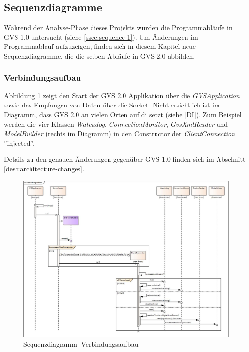 \documentclass[11pt,a4paper,english,oneside]{book}
\numberwithin{equation}{chapter}
\begin{document}
	\subsection{Sequenzdiagramme}
	Während der Analyse-Phase dieses Projekts wurden die Programmabläufe in GVS 1.0 untersucht (siehe \ref{ssec:sequence-1}). Um Änderungen im Programmablauf aufzuzeigen, finden sich in diesem Kapitel neue Sequenzdiagramme, die die selben Abläufe in GVS 2.0 abbilden. 
	
	\subsubsection{Verbindungsaufbau}
	Abbildung \ref{fig:sd-verbindungsaufbau-2} zeigt den Start der GVS 2.0 Applikation über die \textit{GVSApplication} sowie das Empfangen von Daten über die Socket. Nicht ersichtlich ist im Diagramm, dass GVS 2.0 an vielen Orten auf \gls{di} setzt (siehe \ref{DI}). Zum Beispiel werden die vier Klassen \textit{Watchdog},  \textit{ConnectionMonitor},  \textit{GvsXmlReader} und  \textit{ModelBuilder} (rechts im Diagramm) in den Constructor der  \textit{ClientConnection} ''injected''.
	
	Details zu den genauen Änderungen gegenüber GVS 1.0 finden sich im Abschnitt \ref{desc:architecture-changes}.

	\begin{figure}[h!]
		\centering
		\includegraphics[width=\linewidth]{assets/images/sequence_Verbindungsaufbau}
		\caption{Sequenzdiagramm: Verbindungsaufbau}
		\label{fig:sd-verbindungsaufbau-2}
	\end{figure}
	
\end{document}
